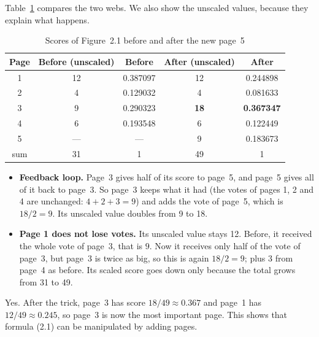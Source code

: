 Table~\ref{tab:ex1} compares the two webs. We also show the unscaled values, because they explain what happens.

\begin{table}[H]\centering
\begin{tabular}{ccccc}
\toprule
\textbf{Page} & \textbf{Before (unscaled)} & \textbf{Before} & \textbf{After (unscaled)} & \textbf{After} \\
\midrule
1 & 12 & 0.387097 & 12 & 0.244898 \\
2 & 4 & 0.129032 & 4 & 0.081633 \\
3 & 9 & 0.290323 & \textbf{18} & \textbf{0.367347} \\
4 & 6 & 0.193548 & 6 & 0.122449 \\
5 & --- & --- & 9 & 0.183673 \\
\midrule
sum & 31 & 1 & 49 & 1 \\
\bottomrule
\end{tabular}
\caption{Scores of Figure~2.1 before and after the new page~5}
\label{tab:ex1}
\end{table}

\begin{itemize}
  \item \textbf{Feedback loop.} Page~3 gives half of its score to page~5, and page~5 gives all of it back to page~3. So page~3 keeps what it had (the votes of pages 1, 2 and 4 are unchanged: $4 + 2 + 3 = 9$) and adds the vote of page~5, which is $18/2 = 9$. Its unscaled value doubles from 9 to 18.
  \item \textbf{Page 1 does not lose votes.} Its unscaled value stays 12. Before, it received the whole vote of page~3, that is $9$. Now it receives only half of the vote of page~3, but page~3 is twice as big, so this is again $18/2 = 9$; plus $3$ from page~4 as before. Its scaled score goes down only because the total grows from 31 to 49.
\end{itemize}


Yes. After the trick, page~3 has score $18/49 \approx 0.367$ and page~1 has $12/49 \approx 0.245$, so page~3 is now the most important page.
This shows that formula (2.1) can be manipulated by adding pages.
